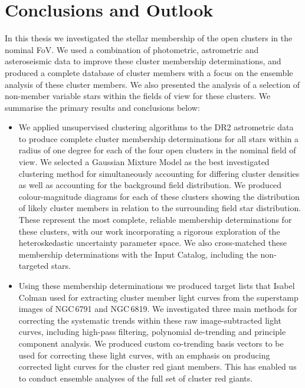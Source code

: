 \chapter{Conclusions and Outlook}

In this thesis we investigated the stellar membership of the open clusters in the nominal \Kepler{} FoV. We used a combination of photometric, astrometric and asteroseismic data to improve these cluster membership determinations, and produced a complete database of cluster members with a focus on the ensemble analysis of these cluster members. We also presented the analysis of a selection of non-member variable stars within the fields of view for these clusters. We summarise the primary results and conclusions below:

\begin{itemize}
    \item We applied unsupervised clustering algorithms to the \Gaia{} DR2 astrometric data to produce complete cluster membership determinations for all stars within a radius of one degree for each of the four open clusters in the nominal \Kepler{} field of view. We selected a Gaussian Mixture Model as the best investigated clustering method for simultaneously accounting for differing cluster densities as well as accounting for the background field distribution. We produced colour-magnitude diagrams for each of these clusters showing the distribution of likely cluster members in relation to the surrounding field star distribution. These represent the most complete, reliable membership determinations for these clusters, with our work incorporating a rigorous exploration of the heteroskedastic uncertainty parameter space. We also cross-matched these \Gaia{} membership determinations with the \Kepler{} Input Catalog, including the non-targeted \Kepler{} stars.
    
    \item Using these membership determinations we produced target lists that Isabel Colman used for extracting cluster member light curves from the \Kepler{} superstamp images of NGC\,6791 and NGC\,6819. We investigated three main methods for correcting the systematic trends within these raw image-subtracted light curves, including high-pass filtering, polynomial de-trending and principle component analysis. We produced custom co-trending basis vectors to be used for correcting these light curves, with an emphasis on producing corrected light curves for the cluster red giant members. This has enabled us to conduct ensemble analyses of the full set of cluster red giants.


\end{itemize}
